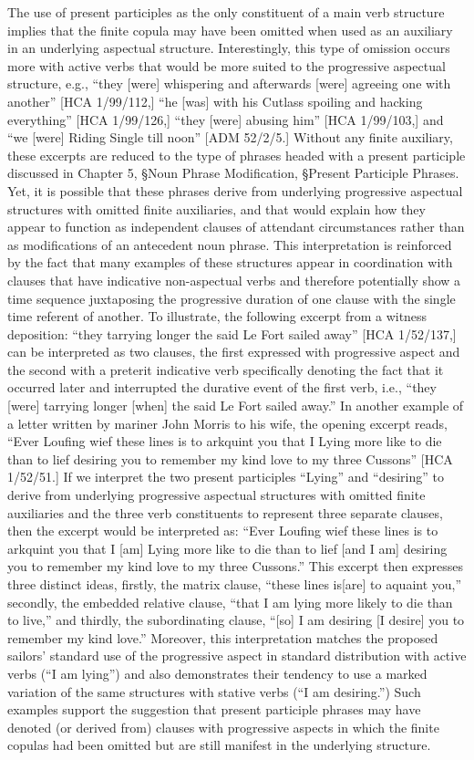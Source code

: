 The use of present participles as the only constituent of a main verb structure implies that the finite copula may have been omitted when used as an auxiliary in an underlying aspectual structure. Interestingly, this type of omission occurs more with active verbs that would be more suited to the progressive aspectual structure, e.g., “they [were] whispering and afterwards [were] agreeing one with another” [HCA 1/99/112,] “he [was] with his Cutlass spoiling and hacking everything” [HCA 1/99/126,] “they [were] abusing him” [HCA 1/99/103,] and “we [were] Riding Single till noon” [ADM 52/2/5.] Without any finite auxiliary, these excerpts are reduced to the type of phrases headed with a present participle discussed in Chapter 5, §Noun Phrase Modification, §Present Participle Phrases. Yet, it is possible that these phrases derive from underlying progressive aspectual structures with omitted finite auxiliaries, and that would explain how they appear to function as independent clauses of attendant circumstances rather than as modifications of an antecedent noun phrase. This interpretation is reinforced by the fact that many examples of these structures appear in coordination with clauses that have indicative non-aspectual verbs and therefore potentially show a time sequence juxtaposing the progressive duration of one clause with the single time referent of another. To illustrate, the following excerpt from a witness deposition: “they tarrying longer the said Le Fort sailed away” [HCA 1/52/137,] can be interpreted as two clauses, the first expressed with progressive aspect and the second with a preterit indicative verb specifically denoting the fact that it occurred later and interrupted the durative event of the first verb, i.e., “they [were] tarrying longer [when] the said Le Fort sailed away.”  In another example of a letter written by mariner John Morris to his wife, the opening excerpt reads, “Ever Loufing wief these lines is to arkquint you that I Lying more like to die than to lief desiring you to remember my kind love to my three Cussons” [HCA 1/52/51.] If we interpret the two present participles “Lying” and “desiring” to derive from underlying progressive aspectual structures with omitted finite auxiliaries and the three verb constituents to represent three separate clauses, then the excerpt would be interpreted as: “Ever Loufing wief these lines is to arkquint you that I [am] Lying more like to die than to lief [and I am] desiring you to remember my kind love to my three Cussons.” This excerpt then expresses three distinct ideas, firstly, the matrix clause, “these lines is[are] to aquaint you,” secondly, the embedded relative clause, “that I am lying more likely to die than to live,” and thirdly, the subordinating clause, “[so] I am desiring [I desire] you to remember my kind love.”  Moreover, this interpretation matches the proposed sailors’ standard use of the progressive aspect in standard distribution with active verbs (“I am lying”) and also demonstrates their tendency to use a marked variation of the same structures with stative verbs (“I am desiring.”) Such examples support the suggestion that present participle phrases may have denoted (or derived from) clauses with progressive aspects in which the finite copulas had been omitted but are still manifest in the underlying structure. 

